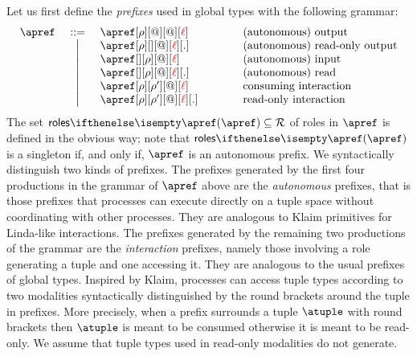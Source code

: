 %
Let us first define the \emph{prefixes} used in global types
with the following grammar:
%
\[\begin{array}{lcl@{\qquad\qquad}l}
  \apref & \bnfdef
  & \apref[\arole][@][@][\alocvar] & \text{(autonomous) output}
  \\ & \bnfmid
  & \apref[\arole][{}][@][\alocvar][.] & \text{(autonomous) read-only output}
  \\ & \bnfmid
  & \apref[{}][\arole][@][\alocvar] & \text{(autonomous) input}
  \\ & \bnfmid
  & \apref[{}][\arole][@][\alocvar][.] & \text{(autonomous) read}
  \\ & \bnfmid
  & \apref[\arole][\arole'][@][\alocvar] & \text{consuming interaction}
  \\ & \bnfmid
  & \apref[\arole][\arole'][@][\alocvar][.]  & \text{read-only interaction}
  \end{array}
\]
%
The set $\roles \apref \subseteq \roleset$ of roles in $\apref$ is
defined in the obvious way; note that $\roles \apref$ is a singleton
if, and only if, $\apref$ is an autonomous prefix.
%
We syntactically distinguish two kinds of prefixes.
%
The prefixes generated by the first four productions in the grammar of
$\apref$ above are the \emph{autonomous} prefixes, that is those
prefixes that processes can execute directly on a tuple space without
coordinating with other processes. 
They are analogous to Klaim primitives for Linda-like interactions.
%
The prefixes generated by the remaining two productions of the grammar
are the \emph{interaction} prefixes, namely those involving a role
generating a tuple and one accessing it.
They are analogous to the usual prefixes of global types.
%
Inspired by Klaim, processes can access tuple types according to two
modalities syntactically distinguished by the round brackets around
the tuple in prefixes.
%
More precisely, when a prefix surrounds a tuple $\atuple$ with round
brackets then $\atuple$ is meant to be consumed otherwise it is meant
to be read-only.
%
%
We assume that tuple types used in read-only modalities do not
generate.
%

